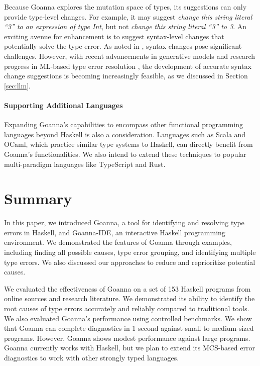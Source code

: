 \documentclass[pdflatex,lineno,sn-nature,Numbered]{sn-jnl}%
\begin{document}
Because Goanna explores the mutation space of types, its suggestions can only provide type-level changes. For example, it may suggest {\it change this string literal ``3'' to an expression of type Int}, but not {\it change this string literal ``3'' to 3}.  An exciting avenue for enhancement is to suggest syntax-level changes that potentially solve the type error. As noted in \cite{Chen2014-dz}, syntax changes pose significant challenges. However, with recent advancements in generative models and research progress in ML-based type error resolution \cite{Seidel2017-uf}, the development of accurate syntax change suggestions is becoming increasingly feasible, as we discussed in Section \ref{sec:llm}.

\paragraph{Supporting Additional Languages}

Expanding Goanna's capabilities to encompass other functional programming languages beyond Haskell is also a consideration. Languages such as Scala and OCaml, which practice similar type systems to Haskell, can directly benefit from Goanna's functionalities. We also intend to extend these techniques to popular multi-paradigm languages like TypeScript and Rust.



\section{Summary} \label{sec:conclusion}

In this paper, we introduced Goanna, a tool for identifying and resolving type errors in Haskell, and Goanna-IDE, an interactive Haskell programming environment. We demonstrated the features of Goanna through examples, including finding all possible causes, type error grouping, and identifying multiple type errors. We also discussed our approaches to reduce and reprioritize potential causes.

We evaluated the effectiveness of Goanna on a set of 153 Haskell programs from online sources and research literature. We demonstrated its ability to identify the root causes of type errors accurately and reliably compared to traditional tools. We also evaluated Goanna's performance using controlled benchmarks. We show that Goanna can complete diagnostics in 1 second against small to medium-sized programs. However, Goanna shows modest performance against large programs. Goanna currently works with Haskell, but we plan to extend its MCS-based error diagnostics to work with other strongly typed languages.
\end{document}
